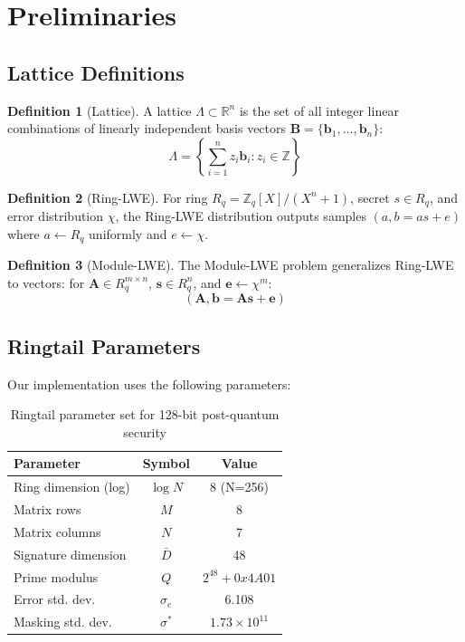 \documentclass[11pt,a4paper]{article}
\theoremstyle{definition}
\newtheorem{definition}{Definition}
\begin{document}
\section{Preliminaries}

\subsection{Lattice Definitions}

\begin{definition}[Lattice]
A lattice $\Lambda \subset \mathbb{R}^n$ is the set of all integer linear combinations of linearly independent basis vectors $\mathbf{B} = \{\mathbf{b}_1, \ldots, \mathbf{b}_n\}$:
\[
\Lambda = \left\{ \sum_{i=1}^{n} z_i \mathbf{b}_i : z_i \in \mathbb{Z} \right\}
\]
\end{definition}

\begin{definition}[Ring-LWE]
For ring $R_q = \mathbb{Z}_q[X]/(X^n + 1)$, secret $s \in R_q$, and error distribution $\chi$, the Ring-LWE distribution outputs samples $(a, b = as + e)$ where $a \leftarrow R_q$ uniformly and $e \leftarrow \chi$.
\end{definition}

\begin{definition}[Module-LWE]
The Module-LWE problem generalizes Ring-LWE to vectors: for $\mathbf{A} \in R_q^{m \times n}$, $\mathbf{s} \in R_q^n$, and $\mathbf{e} \leftarrow \chi^m$:
\[
(\mathbf{A}, \mathbf{b} = \mathbf{A}\mathbf{s} + \mathbf{e})
\]
\end{definition}

\subsection{Ringtail Parameters}

Our implementation uses the following parameters:

\begin{table}[h]
\centering
\begin{tabular}{lcc}
\toprule
Parameter & Symbol & Value \\
\midrule
Ring dimension (log) & $\log N$ & 8 (N=256) \\
Matrix rows & $M$ & 8 \\
Matrix columns & $N$ & 7 \\
Signature dimension & $\bar{D}$ & 48 \\
Prime modulus & $Q$ & $2^{48} + 0x4A01$ \\
Error std. dev. & $\sigma_e$ & 6.108 \\
Masking std. dev. & $\sigma^*$ & $1.73 \times 10^{11}$ \\
\bottomrule
\end{tabular}
\caption{Ringtail parameter set for 128-bit post-quantum security}
\end{table}
\end{document}
